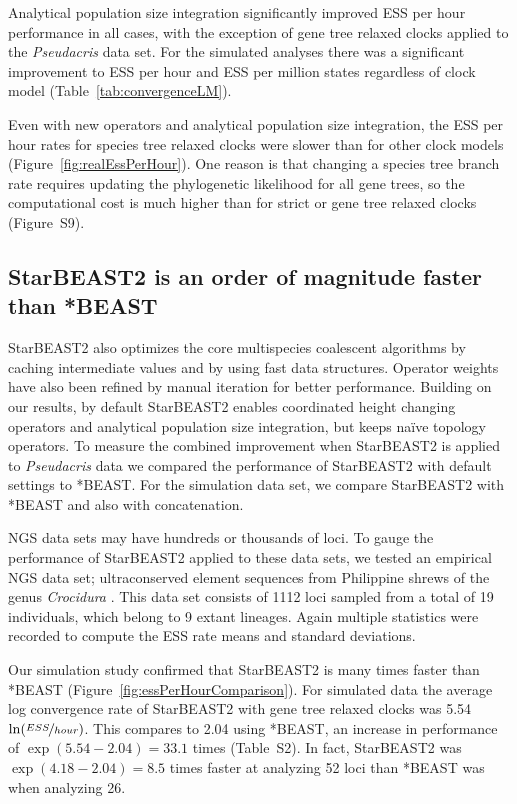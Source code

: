 \documentclass[nogrid]{MBE}%
\begin{document}
Analytical population size integration significantly improved ESS per hour
performance in all cases, with the exception of gene tree relaxed clocks
applied to the \textit{Pseudacris} data set. For the simulated analyses there
was a significant improvement to ESS per hour and ESS per million states
regardless of clock model (Table~\ref{tab:convergenceLM}).

Even with new operators and analytical population size integration, the ESS
per hour rates for species tree relaxed clocks were slower than for other
clock models (Figure~\ref{fig:realEssPerHour}). One reason is that changing a
species tree branch rate requires updating the phylogenetic likelihood for all
gene trees, so the computational cost is much higher than for strict or gene
tree relaxed clocks (Figure~S9).

\subsection{StarBEAST2 is an order of magnitude faster than *BEAST}

StarBEAST2 also optimizes the core multispecies coalescent algorithms by
caching intermediate values and by using fast data structures. Operator
weights have also been refined by manual iteration for better performance.
Building on our results, by default StarBEAST2 enables coordinated height
changing operators and analytical population size integration, but keeps
na\"ive topology operators. To measure the combined improvement when
StarBEAST2 is applied to \textit{Pseudacris} data we compared the performance
of StarBEAST2 with default settings to *BEAST. For the simulation data set, we
compare StarBEAST2 with *BEAST and also with concatenation.

NGS data sets may have hundreds or thousands of loci. To gauge the performance
of StarBEAST2 applied to these data sets, we tested an empirical NGS data set;
ultraconserved element \citep[UCE;][]{Faircloth01102012} sequences from
Philippine shrews of the genus \textit{Crocidura} \citep{Giarla01092015}. This
data set consists of 1112 loci sampled from a total of 19 individuals, which
belong to 9 extant lineages. Again multiple statistics were recorded to
compute the ESS rate means and standard deviations.

Our simulation study confirmed that StarBEAST2 is many times faster than
*BEAST (Figure~\ref{fig:essPerHourComparison}). For simulated data the average
log convergence rate of StarBEAST2 with gene tree relaxed clocks was 5.54
$\ln(\nicefrac{ESS}{hour})$. This compares to 2.04 using *BEAST, an
increase in performance of $\exp(5.54 - 2.04) = 33.1$ times (Table~S2). In
fact, StarBEAST2 was
$\exp(4.18 - 2.04) = 8.5$ times faster at analyzing 52 loci than *BEAST
was when analyzing 26.
\end{document}
